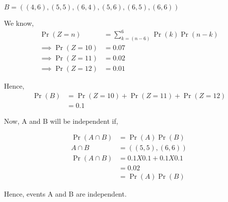 \documentclass[]{article}
\begin{document}
$B = ((4,6), (5,5), (6,4), (5,6), (6,5), (6,6))$

We know,
\begin{align}
\Pr(Z=n) &= \sum_{k=(n-6)}^6\Pr(k)\Pr(n-k)\\
\implies \Pr(Z=10) &= 0.07\\
\implies \Pr(Z=11) &= 0.02\\
\implies \Pr(Z=12) &= 0.01
\end{align}

Hence,
\begin{align}
\Pr(B) &= \Pr(Z=10) + \Pr(Z=11) + \Pr(Z=12)\\
&= 0.1
\end{align}

Now, A and B will be independent if,

\begin{align}
\Pr(A \cap B) &= \Pr(A)\Pr(B)\\
A \cap B &= ((5,5), (6,6)) \\
\Pr(A \cap B) &= 0.1 X 0.1 + 0.1 X 0.1\\
&= 0.02\\
&= \Pr(A)\Pr(B)
\end{align}

Hence, events A and B are independent.
\end{document}
